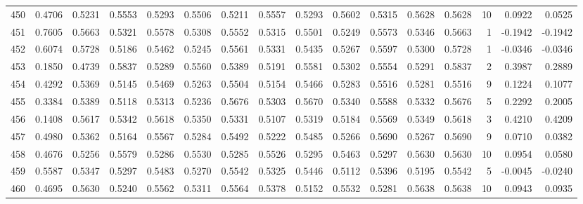 \begin{tabular}{lrrrrrrrrrrrrrrr}
450 &      0.4706 &  0.5231 &  0.5553 &  0.5293 &  0.5506 &  0.5211 &  0.5557 &  0.5293 &  0.5602 &  0.5315 &   0.5628 &     0.5628 &     10 &                    0.0922 &                     0.0525 \\
451 &      0.7605 &  0.5663 &  0.5321 &  0.5578 &  0.5308 &  0.5552 &  0.5315 &  0.5501 &  0.5249 &  0.5573 &   0.5346 &     0.5663 &      1 &                   -0.1942 &                    -0.1942 \\
452 &      0.6074 &  0.5728 &  0.5186 &  0.5462 &  0.5245 &  0.5561 &  0.5331 &  0.5435 &  0.5267 &  0.5597 &   0.5300 &     0.5728 &      1 &                   -0.0346 &                    -0.0346 \\
453 &      0.1850 &  0.4739 &  0.5837 &  0.5289 &  0.5560 &  0.5389 &  0.5191 &  0.5581 &  0.5302 &  0.5554 &   0.5291 &     0.5837 &      2 &                    0.3987 &                     0.2889 \\
454 &      0.4292 &  0.5369 &  0.5145 &  0.5469 &  0.5263 &  0.5504 &  0.5154 &  0.5466 &  0.5283 &  0.5516 &   0.5281 &     0.5516 &      9 &                    0.1224 &                     0.1077 \\
455 &      0.3384 &  0.5389 &  0.5118 &  0.5313 &  0.5236 &  0.5676 &  0.5303 &  0.5670 &  0.5340 &  0.5588 &   0.5332 &     0.5676 &      5 &                    0.2292 &                     0.2005 \\
456 &      0.1408 &  0.5617 &  0.5342 &  0.5618 &  0.5350 &  0.5331 &  0.5107 &  0.5319 &  0.5184 &  0.5569 &   0.5349 &     0.5618 &      3 &                    0.4210 &                     0.4209 \\
457 &      0.4980 &  0.5362 &  0.5164 &  0.5567 &  0.5284 &  0.5492 &  0.5222 &  0.5485 &  0.5266 &  0.5690 &   0.5267 &     0.5690 &      9 &                    0.0710 &                     0.0382 \\
458 &      0.4676 &  0.5256 &  0.5579 &  0.5286 &  0.5530 &  0.5285 &  0.5526 &  0.5295 &  0.5463 &  0.5297 &   0.5630 &     0.5630 &     10 &                    0.0954 &                     0.0580 \\
459 &      0.5587 &  0.5347 &  0.5297 &  0.5483 &  0.5270 &  0.5542 &  0.5325 &  0.5446 &  0.5112 &  0.5396 &   0.5195 &     0.5542 &      5 &                   -0.0045 &                    -0.0240 \\
460 &      0.4695 &  0.5630 &  0.5240 &  0.5562 &  0.5311 &  0.5564 &  0.5378 &  0.5152 &  0.5532 &  0.5281 &   0.5638 &     0.5638 &     10 &                    0.0943 &                     0.0935 \\

\end{tabular}
